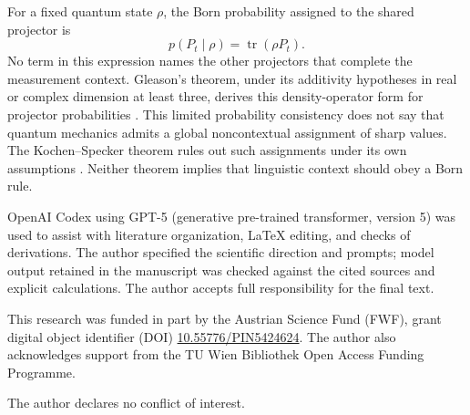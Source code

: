 \documentclass[
  aps,
  reprint,
  superscriptaddress,
  floatfix,
  nofootinbib,
  longbibliography
]{revtex4-2}
\begin{document}
For a fixed quantum state $\rho$, the Born probability assigned to the shared
projector is
\begin{equation}
 p(P_t\mid\rho)=\operatorname{tr}(\rho P_t).
 \label{eq:born-shared-app}
\end{equation}
No term in this expression names the other projectors that complete the
measurement context.  Gleason's theorem, under its additivity hypotheses in
real or complex dimension at least three, derives this density-operator form
for projector probabilities \cite{Gleason}.  This limited probability
consistency does not say that quantum mechanics admits a global
noncontextual assignment of sharp values.  The Kochen--Specker theorem rules
out such assignments under its own assumptions \cite{specker-60,kochen1}.
Neither theorem implies that linguistic context should obey a Born rule.

\begin{acknowledgments}
OpenAI Codex using GPT-5 (generative pre-trained transformer, version 5) was
used to assist with literature organization, \LaTeX{}
editing, and checks of derivations.  The author specified the scientific
direction and prompts; model output retained in the manuscript was checked
against the cited sources and explicit calculations.  The author accepts full
responsibility for the final text.

This research was funded in part by the Austrian Science Fund (FWF), grant
digital object identifier (DOI)
\href{https://doi.org/10.55776/PIN5424624}{10.55776/PIN5424624}.
The author also acknowledges support from the TU Wien Bibliothek Open Access
Funding Programme.

The author declares no conflict of interest.
\end{acknowledgments}


\end{document}
